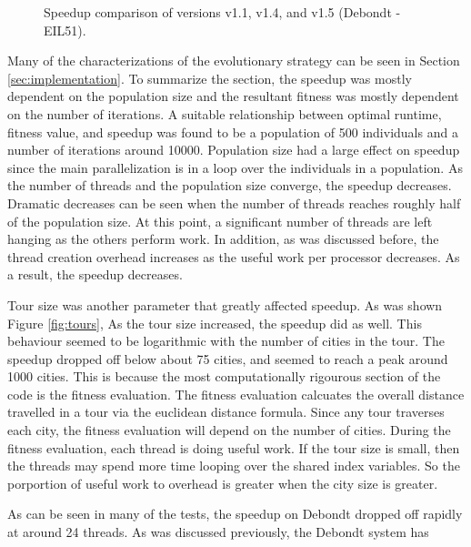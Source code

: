 \documentclass[10pt,letterpaper]{article}
\begin{document}
\begin{figure}
\centering
\caption{Speedup comparison of versions v1.1, v1.4, and v1.5 (Debondt - EIL51).}
\label{fig:versions}
\end{figure}

Many of the characterizations of the evolutionary strategy can be seen in Section \ref{sec:implementation}. To summarize the section, the speedup was mostly dependent on the population size and the resultant fitness was mostly dependent on the number of iterations. A suitable relationship between optimal runtime, fitness value, and speedup was found to be a population of 500 individuals and a number of iterations around 10000. Population size had a large effect on speedup since the main parallelization is in a loop over the individuals in a population. As the number of threads and the population size converge, the speedup decreases. Dramatic decreases can be seen when the number of threads reaches roughly half of the population size. At this point, a significant number of threads are left hanging as the others perform work. In addition, as was discussed before, the thread creation overhead increases as the useful work per processor decreases. As a result, the speedup decreases.

Tour size was another parameter that greatly affected speedup. As was shown Figure \ref{fig:tours}, As the tour size increased, the speedup did as well. %
This behaviour seemed to be logarithmic with the number of cities in the tour. The speedup dropped off below about 75 cities, and seemed to reach a peak around 1000 cities. This is because the most computationally rigourous section of the code is the fitness evaluation. The fitness evaluation calcuates the overall distance travelled in a tour via the euclidean distance formula. Since any tour traverses each city, the fitness evaluation will depend on the number of cities. During the fitness evaluation, each thread is doing useful work. If the tour size is small, then the threads may spend more time looping over the shared index variables. So the porportion of useful work to overhead is greater when the city size is greater.

As can be seen in many of the tests, the speedup on Debondt dropped off rapidly at around 24 threads. As was discussed previously, the Debondt system has 
\end{document}
